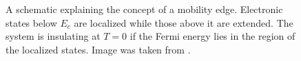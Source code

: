 \documentclass[10pt,a4paper]{article}
\begin{document}
\begin{minipage}[t]{0.45\textwidth} 
\begin{figure}[H]
\caption{A schematic explaining the concept of a mobility edge. Electronic states below $E_c$ are localized while those above it are extended. The system is insulating at $T=0$ if the Fermi energy lies in the region of the localized states. Image was taken from \cite{Kramer}.  }
\label{fig:band_structure} 
\end{figure}
\end{minipage}\\\\
\end{document}
